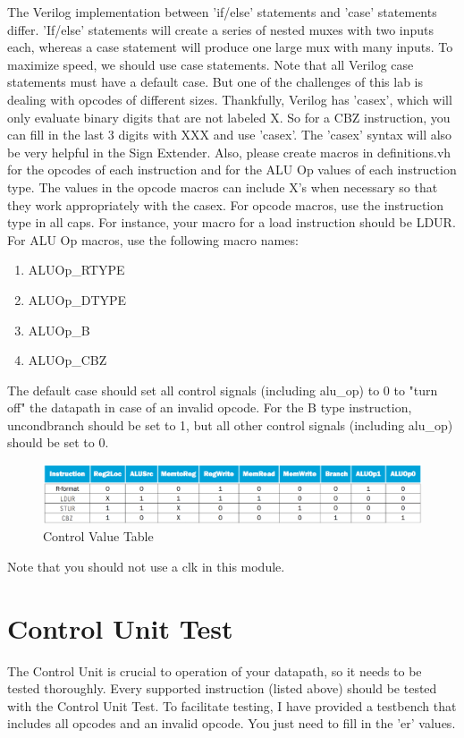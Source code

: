 The Verilog implementation between 'if/else' statements and 'case' statements differ.  'If/else' statements will create a series of nested muxes with two inputs each, whereas a case statement will produce one large mux with many inputs.  To maximize speed, we should use case statements. Note that all Verilog case statements must have a default case. But one of the challenges of this lab is dealing with opcodes of different sizes.  Thankfully, Verilog has 'casex', which will only evaluate binary digits that are not labeled X.  So for a CBZ instruction, you can fill in the last 3 digits with XXX and use 'casex'.  The 'casex' syntax will also be very helpful in the Sign Extender.  Also, please create macros in definitions.vh for the opcodes of each instruction and for the ALU Op values of each instruction type.  The values in the opcode macros can include X's when necessary so that they work appropriately with the casex.  For opcode macros, use the instruction type in all caps.  For instance, your macro for a load instruction should be LDUR.  For ALU Op macros,  use the following macro names:
\begin{enumerate}
	\item ALUOp\_RTYPE
	\item ALUOp\_DTYPE
	\item ALUOp\_B
	\item ALUOp\_CBZ
\end{enumerate} 

The default case should set all control signals (including alu\_op) to 0 to "turn off" the datapath in case of an invalid opcode.  For the B type instruction, uncondbranch should be set to 1, but all other control signals (including alu\_op) should be set to 0.

\begin{figure}
	\caption{Control Value Table}\label{fig:control_value_table}
	\begin{center}
		\includegraphics[width=4.75in]{../images/control_value_table.png}
	\end{center}
\end{figure} 

Note that you should not use a clk in this module.

\section{Control Unit Test}
The Control Unit is crucial to operation of your datapath, so it needs to be tested thoroughly.  Every supported instruction (listed above) should be tested with the Control Unit Test.  To facilitate testing, I have provided a testbench that includes all opcodes and an invalid opcode.  You just need to fill in the 'er' values.

